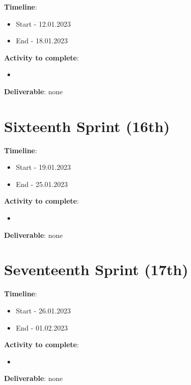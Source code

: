 \textbf{Timeline}:
\begin{itemize}
    \item Start - 12.01.2023
	\item End - 18.01.2023
\end{itemize}

\textbf{Activity to complete}:
\begin{itemize}
    \item {}
\end{itemize}

\textbf{Deliverable}: none

\section{Sixteenth Sprint (16th)}
\label{sec:planning_sixteenth}

\textbf{Timeline}:
\begin{itemize}
    \item Start - 19.01.2023
	\item End - 25.01.2023
\end{itemize}

\textbf{Activity to complete}:
\begin{itemize}
    \item {}
\end{itemize}

\textbf{Deliverable}: none

\section{Seventeenth Sprint (17th)}
\label{sec:planning_seventeenth}

\textbf{Timeline}:
\begin{itemize}
    \item Start - 26.01.2023
	\item End - 01.02.2023
\end{itemize}

\textbf{Activity to complete}:
\begin{itemize}
    \item {}
\end{itemize}

\textbf{Deliverable}: none

